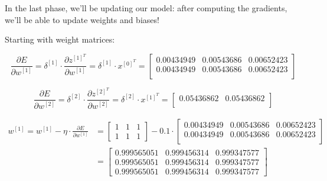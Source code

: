 \documentclass[12pt]{article}
\begin{document}
\begin{enumerate}[leftmargin=\labelsep]
        In the last phase, we'll be updating our model: after computing the gradients,
        we'll be able to update weights and biases!

        Starting with weight matrices:

        \begin{equation*}
          \frac{\partial E}{\partial w^{[1]}} = \delta^{[1]} \cdot
          \frac{\partial z^{[1]^T}}{\partial w^{[1]}}
          = \delta^{[1]} \cdot x^{[0]^T}
          = \begin{bmatrix}
            0.00434949 & 0.00543686 & 0.00652423 \\
            0.00434949 & 0.00543686 & 0.00652423 \\
          \end{bmatrix}
        \end{equation*}

        \begin{equation*}
          \frac{\partial E}{\partial w^{[2]}} = \delta^{[2]} \cdot
          \frac{\partial z^{[2]^T}}{\partial w^{[2]}}
          = \delta^{[2]}
          \cdot x^{[1]^T}
          = \begin{bmatrix}
            0.05436862 & 0.05436862 \\
          \end{bmatrix}
        \end{equation*}

        \begin{equation*}
          \begin{aligned}
            w^{[1]} = w^{[1]} - \eta \cdot \frac{\partial E}{\partial w^{[1]}}
             & = \begin{bmatrix}
                   1 & 1 & 1 \\
                   1 & 1 & 1
                 \end{bmatrix} - 0.1 \cdot \begin{bmatrix}
                                             0.00434949 & 0.00543686 & 0.00652423 \\
                                             0.00434949 & 0.00543686 & 0.00652423 \\
                                           \end{bmatrix} \\
             & = \begin{bmatrix}
                   0.999565051 & 0.999456314 & 0.999347577 \\
                   0.999565051 & 0.999456314 & 0.999347577 \\
                   0.999565051 & 0.999456314 & 0.999347577
                 \end{bmatrix}
          \end{aligned}
        \end{equation*}


\end{enumerate}
\end{document}
